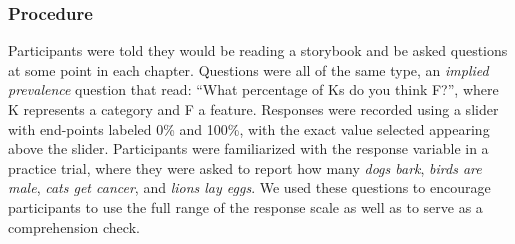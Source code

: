 \documentclass[10pt,letterpaper]{article}
\newcommand\Tstrut{\rule{0pt}{2.6ex}}       %
\newcommand\Bstrut{\rule[-1ex]{0pt}{0pt}} %
\newcommand{\TBstrut}{\Tstrut\Bstrut} %
\begin{document}


\subsubsection{Procedure}
Participants were told they would be reading a storybook and be asked questions at some point in each chapter. 
Questions were all of the same type, an \emph{implied prevalence} question \cite{Gelman2002, Cimpian2010} that read: ``What percentage of Ks do you think F?'', where K represents a category and F a feature. 
Responses were recorded using a slider with end-points labeled 0\% and 100\%, with the exact value selected appearing above the slider. 
Participants were familiarized with the response variable in a practice trial, where they were asked to report how many \emph{dogs bark}, \emph{birds are male}, \emph{cats get cancer}, and \emph{lions lay eggs}. 
We used these questions to encourage participants to use the full range of the response scale as well as to serve as a comprehension check. 
\end{document}
